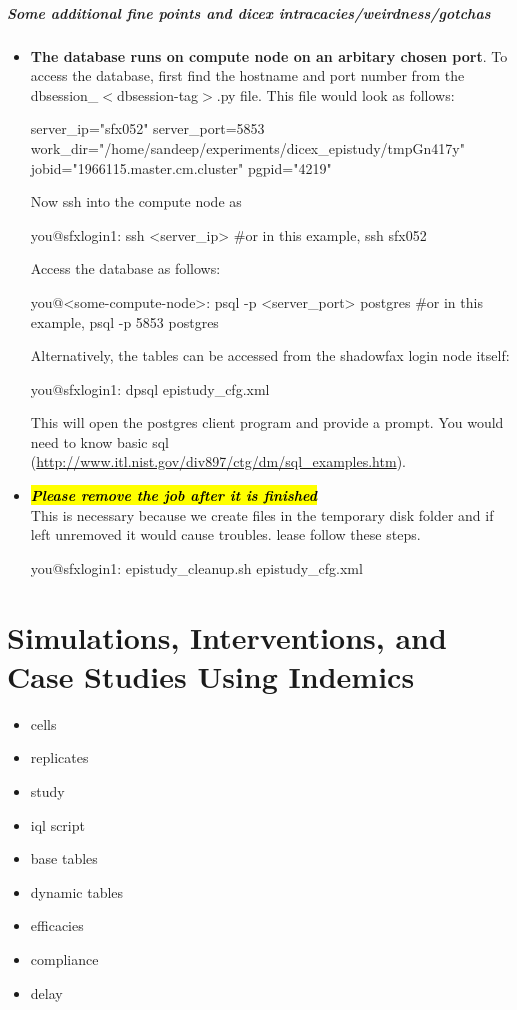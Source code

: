 \documentclass[11]{report}
\begin{document}
\paragraph{Some additional fine points and dicex intracacies/weirdness/gotchas}

\begin{itemize}
\item {\bf The database runs on compute node on an arbitary chosen port}. To access the database, first find the hostname and port number from the  dbsession\_$<$dbsession-tag$>$.py file.  This file would look as follows:
\begin{code}
server_ip="sfx052"
server_port=5853
work_dir="/home/sandeep/experiments/dicex_epistudy/tmpGn417y"
jobid="1966115.master.cm.cluster"
pgpid="4219"
\end{code}
Now ssh into the compute node as 
\begin{code}
you@sfxlogin1: ssh <server_ip>   #or in this example, ssh sfx052
\end{code}

Access the database as follows:
\begin{code}
you@<some-compute-node>: psql -p <server_port> postgres  #or in this example,  psql -p 5853 postgres
\end{code}
Alternatively, the tables can be accessed from the shadowfax login node itself:
\begin{code}
you@sfxlogin1: dpsql epistudy_cfg.xml
\end{code}
This will open the postgres client program and provide a prompt. You would need to know basic 
sql (\url{http://www.itl.nist.gov/div897/ctg/dm/sql_examples.htm}).

\item {\hl {\emph{\bf Please remove the job after it is finished}}}\\
This is necessary because we create files in the temporary disk folder and if left unremoved it would cause troubles. lease follow these steps. 
\begin{code}
you@sfxlogin1: epistudy_cleanup.sh epistudy_cfg.xml
\end{code}

\end{itemize}

\chapter{Simulations, Interventions, and Case Studies Using Indemics}
\begin{itemize}
\item cells
\item replicates
\item study
\item iql script
\item base tables
\item dynamic tables
\item efficacies
\item compliance
\item delay
\end{itemize}
\end{document}
